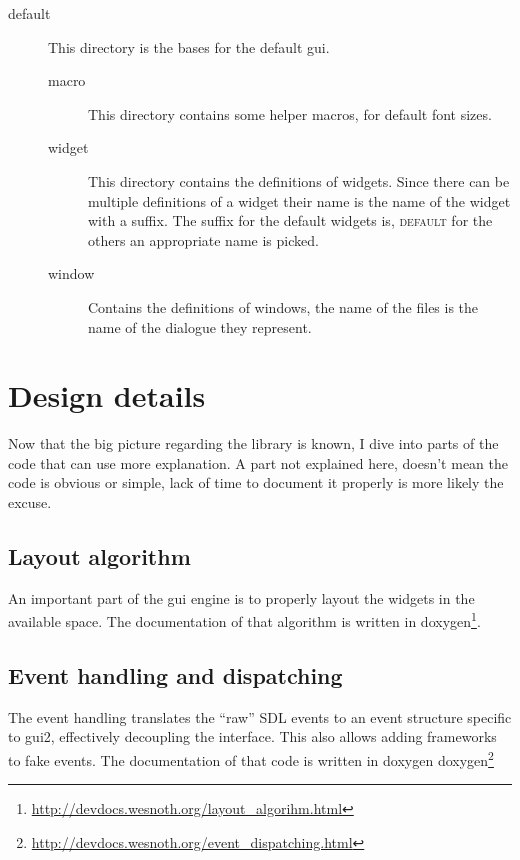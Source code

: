 \documentclass[a4paper,notitlepage,twocolumn,draft]{report}
\begin{document}
\begin{description}
\begin{description}
\item[default] This directory is the bases for the default gui.

\begin{description}
\item[macro] This directory contains some helper macros, for default font sizes.
\item[widget] This directory contains the definitions of widgets. Since there
	can be multiple definitions of a widget their name is the name of the widget
	with a suffix. The suffix for the default widgets is, \textsc{default} for
	the others an appropriate name is picked.
\item[window] Contains the definitions of windows, the name of the files is the
	name of the dialogue they represent.
\end{description}

\end{description}

\end{description}


\chapter{Design details}

Now that the big picture regarding the library is known, I dive into parts of
the code that can use more explanation. A part not explained here, doesn't mean
the code is obvious or simple, lack of time to document it properly is more
likely the excuse.

\section{Layout algorithm}

An important part of the gui engine is to properly layout the widgets in the
available space. The documentation of that algorithm is written in
doxygen\footnote{\url{http://devdocs.wesnoth.org/layout_algorihm.html}}.

\section{Event handling and dispatching}
\label{event_handling}

The event handling translates the ``raw'' SDL events to an event structure
specific to gui2, effectively decoupling the interface. This also allows adding
frameworks to fake events. The documentation of that code is written in doxygen
doxygen\footnote{\url{http://devdocs.wesnoth.org/event_dispatching.html}}
\end{document}
